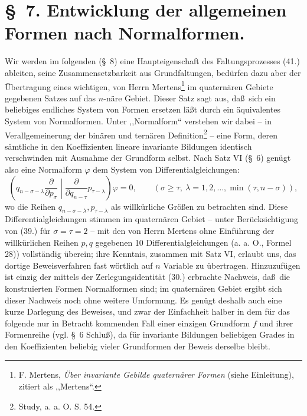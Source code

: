 \documentclass[11pt]{article}
\begin{document}
\section*{\S\ 7. Entwicklung der allgemeinen Formen nach Normalformen.}
Wir werden im folgenden (\S\ 8) eine Haupteigenschaft des Faltungsprozesses (41.) ableiten, seine Zusammensetzbarkeit aus Grundfaltungen, bed\"urfen dazu aber der \"Ubertragung eines wichtigen, von Herrn Mertens\footnote{F. Mertens, \emph{\"Uber invariante Gebilde quatern\"arer Formen} (siehe Einleitung), zitiert als ,,Mertens``.} im quatern\"aren Gebiete gegebenen Satzes auf das $n$-n\"are Gebiet. Dieser Satz sagt aus, da\ss\ sich ein beliebiges endliches System von Formen ersetzen l\"a\ss t durch ein \"aquivalentes System von Normalformen. Unter ,,Normalform`` verstehen wir dabei -- in Verallgemeinerung der bin\"aren und tern\"aren Definition\footnote{Study, a. a. O. S. 54.} -- eine Form, deren s\"amtliche in den Koeffizienten lineare invariante Bildungen identisch verschwinden mit Ausnahme der Grundform selbst. Nach Satz VI (\S\ 6) gen\"ugt also eine Normalform $\varphi$ dem System von Differentialgleichungen:
\begin{equation}
 \left(q_{n-\sigma-\lambda}\frac{\partial}{\partial p_\sigma}\middle|\frac{\partial}{\partial q_{n-\tau}}p_{\tau-\lambda}\right)\varphi=0,
 \qquad(\sigma\ge\tau,\ \lambda=1,2,\ldots,\min(\tau,n-\sigma)),
\tag{46}
\end{equation}
wo die Reihen $q_{n-\sigma-\lambda},p_{\tau-\lambda}$ als willk\"urliche Gr\"o\ss en zu betrachten sind. Diese Differentialgleichungen stimmen im quatern\"aren Gebiet -- unter Ber\"ucksichtigung von (39.) f\"ur $\sigma=\tau=2$ -- mit den von Herrn Mertens ohne Einf\"uhrung der willk\"urlichen Reihen $p,q$ gegebenen 10 Differentialgleichungen (a. a. O., Formel 28)) vollst\"andig \"uberein; ihre Kenntnis, zusammen mit Satz VI, erlaubt uns, das dortige Beweisverfahren fast w\"ortlich auf $n$ Variable zu \"ubertragen. Hinzuzuf\"ugen ist einzig der mittels der Zerlegungsidentit\"at (30.) erbrachte Nachweis, da\ss\ die konstruierten Formen Normalformen sind; im quatern\"aren Gebiet ergibt sich dieser Nachweis noch ohne weitere Umformung. Es gen\"ugt deshalb auch eine kurze Darlegung des Beweises, und zwar der Einfachheit halber in dem f\"ur das folgende nur in Betracht kommenden Fall einer einzigen Grundform $f$ und ihrer Formenreihe (vgl. \S\ 6 Schlu\ss), da f\"ur invariante Bildungen beliebigen Grades in den Koeffizienten beliebig vieler Grundformen der Beweis derselbe bleibt.
\end{document}
